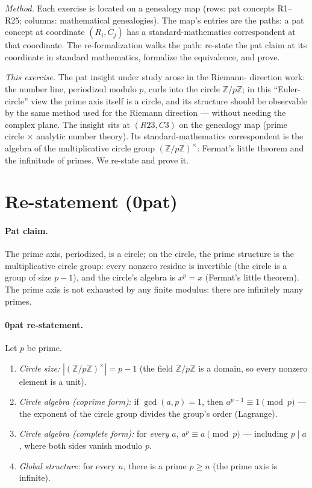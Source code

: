 \documentclass[sigplan,10pt,anonymous,review]{acmart}
\begin{document}
\emph{Method.} Each exercise is located on a genealogy map (rows: pat
concepts R1--R25; columns: mathematical genealogies). The map's entries
are the paths: a pat concept at coordinate $(R_i, C_j)$ has a
standard-mathematics correspondent at that coordinate. The
re-formalization walks the path: re-state the pat claim at its coordinate
in standard mathematics, formalize the equivalence, and prove.

\emph{This exercise.} The pat insight under study arose in the Riemann-
direction work: the number line, periodized modulo $p$, curls into the
circle $\mathbb{Z}/p\mathbb{Z}$; in this ``Euler-circle'' view the prime
axis itself is a circle, and its structure should be observable by the
same method used for the Riemann direction --- without needing the complex
plane. The insight sits at $(R23, C3)$ on the genealogy map (prime circle
$\times$ analytic number theory). Its standard-mathematics correspondent
is the algebra of the multiplicative circle group
$(\mathbb{Z}/p\mathbb{Z})^\times$: Fermat's little theorem and the
infinitude of primes. We re-state and prove it.

\section{Re-statement (0pat)}

\paragraph{Pat claim.} The prime axis, periodized, is a circle; on the
circle, the prime structure is the multiplicative circle group: every
nonzero residue is invertible (the circle is a group of size $p-1$), and
the circle's algebra is $x^p = x$ (Fermat's little theorem). The prime
axis is not exhausted by any finite modulus: there are infinitely many
primes.

\paragraph{0pat re-statement.} Let $p$ be prime.
\begin{enumerate}
\item \emph{Circle size:} $|(\mathbb{Z}/p\mathbb{Z})^\times| = p - 1$
  (the field $\mathbb{Z}/p\mathbb{Z}$ is a domain, so every nonzero
  element is a unit).
\item \emph{Circle algebra (coprime form):} if $\gcd(a,p) = 1$, then
  $a^{p-1} \equiv 1 \pmod p$ --- the exponent of the circle group divides
  the group's order (Lagrange).
\item \emph{Circle algebra (complete form):} for \emph{every} $a$,
  $a^p \equiv a \pmod p$ --- including $p \mid a$, where both sides
  vanish modulo $p$.
\item \emph{Global structure:} for every $n$, there is a prime $p \ge n$
  (the prime axis is infinite).
\end{enumerate}
\end{document}
